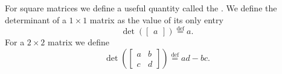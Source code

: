 
For square matrices we define a useful quantity called the
\emph{}.  We define
the determinant of a $1 \times 1$ matrix as the value of its only entry
\begin{equation*}
\det \left(
\begin{bmatrix}
a 
\end{bmatrix}
\right)
\overset{\text{def}}{=}
a .
\end{equation*}
For a $2 \times 2$ matrix we define
\begin{equation*}
\det \left(
\begin{bmatrix}
a & b \\
c & d
\end{bmatrix}
\right)
\overset{\text{def}}{=}
ad-bc .
\end{equation*}

